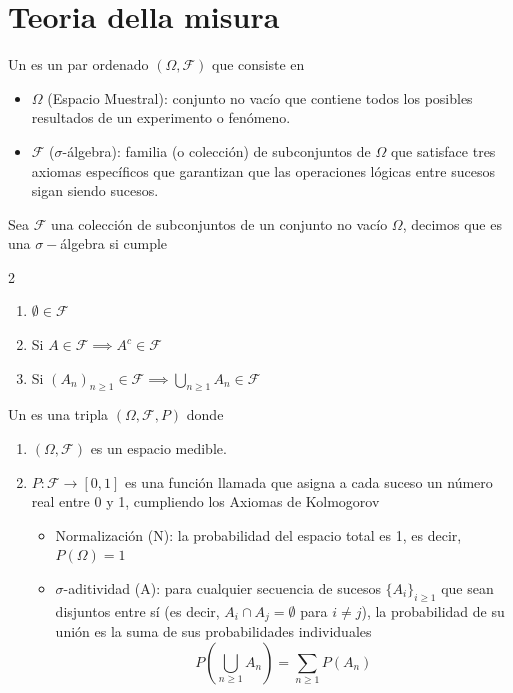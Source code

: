 \section{Teoria della misura}
\begin{definicion}
    Un  es un par ordenado $(\Omega, \mathcal{F})$ que consiste en
    \begin{itemize}
        \item $\Omega$ (Espacio Muestral): conjunto no vacío que contiene todos los posibles resultados de un experimento o fenómeno.
        \item $\mathcal{F}$ ($\sigma$-álgebra): familia (o colección) de subconjuntos de $\Omega$ que satisface tres axiomas específicos que garantizan que las operaciones lógicas entre sucesos sigan siendo sucesos.
    \end{itemize}
\end{definicion}

\begin{definicion}
    Sea $\mathcal{F}$ una colección de subconjuntos de un conjunto no vacío $\Omega$, decimos que es una $\sigma-$álgebra si cumple
    \begin{multicols}{2}
        \begin{enumerate}
            \item $\emptyset \in \mathcal{F}$
            \item Si $A\in \mathcal{F} \implies A^c \in \mathcal{F}$
            \item Si $(A_n)_{n\geq 1} \in \mathcal{F} \implies \bigcup_{n\geq 1} A_n \in \mathcal{F}$
        \end{enumerate}
    \end{multicols}
\end{definicion}

\begin{definicion}
    Un  es una tripla $(\Omega, \mathcal{F}, P)$ donde
    \begin{enumerate}[label=\arabic*)]
        \item $(\Omega, \mathcal{F})$ es un espacio medible.
        \item $P:\mathcal{F}\to [0,1]$ es una función llamada  que asigna a cada suceso un número real entre 0 y 1, cumpliendo los Axiomas de Kolmogorov
        \begin{itemize}
            \item Normalización (N): la probabilidad del espacio total es 1, es decir, $P(\Omega) = 1$
            \item $\sigma$-aditividad (A): para cualquier secuencia de sucesos $\{A_i\}_{i \geq 1}$ que sean disjuntos entre sí (es decir, $A_i \cap A_j = \emptyset$ para $i \neq j$), la probabilidad de su unión es la suma de sus probabilidades individuales
            $$P\left(\bigcup_{n\geq 1} A_n\right) = \sum_{n\geq 1} P(A_n)$$
        \end{itemize}
    \end{enumerate}
\end{definicion}

